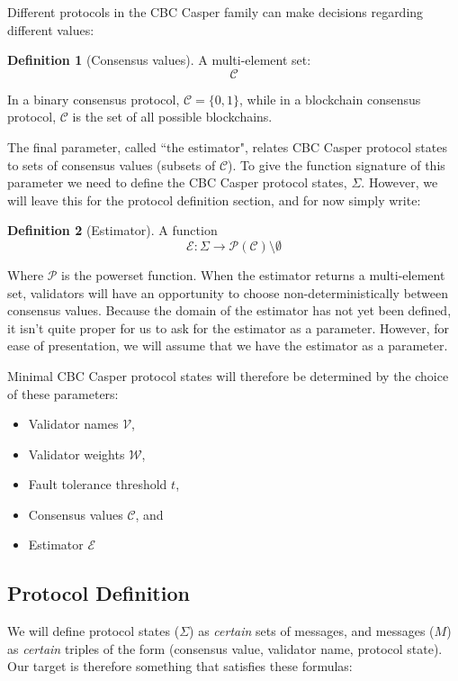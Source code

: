 \documentclass{article}
\theoremstyle{definition}
\newtheorem{defn}{Definition}[section]
\begin{document}
Different protocols in the CBC Casper family can make decisions regarding different values:

\begin{defn}[Consensus values]
A multi-element set:
$$
\mathcal{C}
$$
\end{defn}

In a binary consensus protocol, $\mathcal{C} = \{0,1\}$, while in a blockchain consensus protocol, $\mathcal{C}$ is the set of all possible blockchains.

The final parameter, called ``the estimator", relates CBC Casper protocol states to sets of consensus values (subsets of $\mathcal{C}$). To give the function signature of this parameter we need to define the CBC Casper protocol states, $\Sigma$. However, we will leave this for the protocol definition section, and for now simply write:

\begin{defn}[Estimator]
A function
$$
\mathcal{E}: \Sigma \to \mathcal{P}(\mathcal{C})\setminus\emptyset
$$
\end{defn}

Where $\mathcal{P}$ is the powerset function. When the estimator returns a multi-element set, validators will have an opportunity to choose non-deterministically between consensus values. Because the domain of the estimator has not yet been defined, it isn't quite proper for us to ask for the estimator as a parameter. However, for ease of presentation, we will assume that we have the estimator as a parameter.

Minimal CBC Casper protocol states will therefore be determined by the choice of these parameters:

\begin{itemize}
\item Validator names $\mathcal{V}$,
\item Validator weights $\mathcal{W}$,
\item Fault tolerance threshold $t$,
\item Consensus values $\mathcal{C}$, and
\item Estimator $\mathcal{E}$
\end{itemize}

\pagebreak
\subsection{Protocol Definition}

We will define protocol states ($\Sigma$) as \emph{certain} sets of messages, and messages ($M$) as \emph{certain} triples of the form (consensus value, validator name, protocol state). Our target is therefore something that satisfies these formulas:
\end{document}
